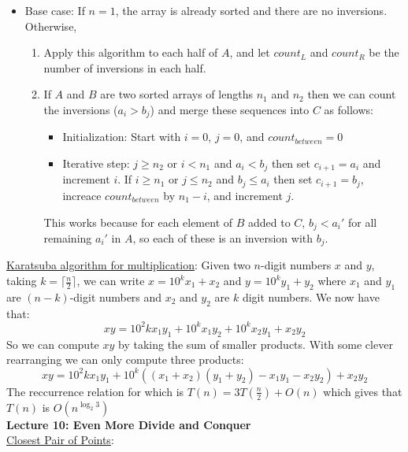 \documentclass{article}
\begin{document}
\begin{itemize}
    \item Base case: If $n = 1$, the array is already sorted and there are no inversions. Otherwise, \begin{enumerate}
        \item Apply this algorithm to each half of $A$, and let $count_L$ and $count_R$ be the number of inversions in each half.
        \item If $A$ and $B$ are two sorted arrays of lengths $n_1$ and $n_2$ then we can count the inversions ($a_i > b_j$) and merge these sequences into $C$ as follows: 
        \begin{itemize}
            \item Initialization: Start with $i = 0$, $j = 0$, and $count_{between} = 0$
            \item Iterative step:  $j \geq n_2$ or $i < n_1$ and $a_i < b_j$ then set $c_{i + 1} = a_i$ and increment $i$. If $i \geq n_1$ or $j \leq n_2$ and $b_j \leq a_i$ then set $c_{i + 1} = b_j$, increace $count_{between}$ by $n_1 - i$, and increment $j$.
        \end{itemize}
        This works because for each element of $B$ added to $C$, $b_j < a_i'$ for all remaining $a_i'$ in $A$, so each of these is an inversion with $b_j$.
    \end{enumerate}
\end{itemize}
\underline{Karatsuba algorithm for multiplication}: Given two $n$-digit numbers $x$ and $y$, taking $k = \lceil \frac{n}{2} \rceil$, we can write $x = 10^kx_1 + x_2$ and $y = 10^ky_1 + y_2$ where $x_1$ and $y_1$ are $(n - k)$-digit numbers and $x_2$ and $y_2$ are $k$ digit numbers. We now have that:
\begin{equation*}
    xy = 10^2kx_1y_1 + 10^kx_1y_2 + 10^kx_2y_1 + x_2y_2
\end{equation*}
So we can compute $xy$ by taking the sum of smaller products. With some clever rearranging we can only compute three products: 
\begin{equation*}
    xy = 10^2kx_1y_1 + 10^k((x_1 + x_2)(y_1 + y_2) - x_1y_1 - x_2y_2) + x_2y_2
\end{equation*}
The reccurrence relation for which is $T(n) = 3T(\frac{n}{2}) + O(n)$ which gives that $T(n)$ is $ O(n^{\log_2 3})$ \\[1.0ex]
\textbf{Lecture 10: Even More Divide and Conquer} \\[1.0ex]
\underline{Closest Pair of Points}:
\end{document}
